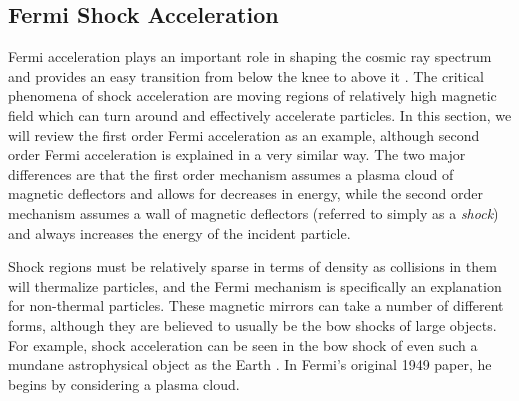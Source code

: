 \subsection{Fermi Shock Acceleration}
\label{fermi}
Fermi acceleration plays an important role in shaping the cosmic ray spectrum and provides an easy transition from below the knee to above it \cite{crapp}. The critical phenomena of shock acceleration are moving regions of relatively high magnetic field which can turn around and effectively accelerate particles. In this section, we will review the first order Fermi acceleration as an example, although second order Fermi acceleration is explained in a very similar way. The two major differences are that the first order mechanism assumes a plasma cloud of magnetic deflectors and allows for decreases in energy, while the second order mechanism assumes a wall of magnetic deflectors (referred to simply as a \textit{shock}) and always increases the energy of the incident particle.

Shock regions must be relatively sparse in terms of density as collisions in them will thermalize particles, and the Fermi mechanism is specifically an explanation for non-thermal particles. These magnetic mirrors can take a number of different forms, although they are believed to usually be the bow shocks of large objects. For example, shock acceleration can be seen in the bow shock of even such a mundane astrophysical object as the Earth \cite{shocks}. In Fermi's original 1949 paper, he begins by considering a plasma cloud.

